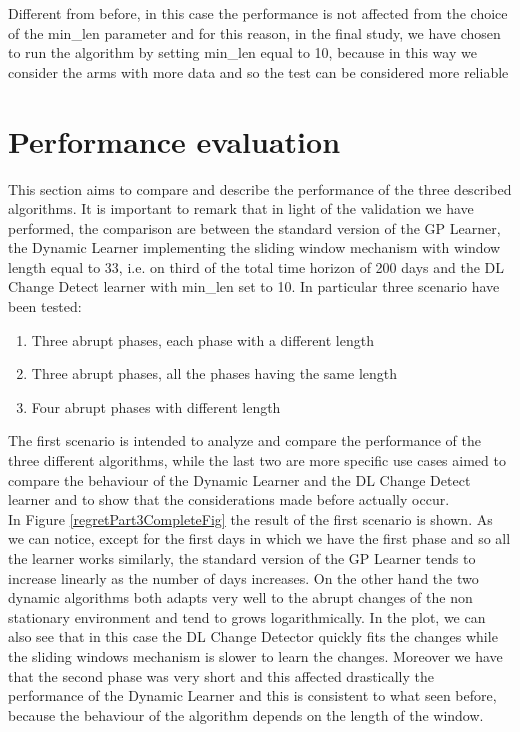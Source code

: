 Different from before, in this case the performance is not affected from the choice of the min\_len parameter and for this reason, in the final study, we have chosen to run the algorithm by setting min\_len equal to 10, because in this way we consider the arms with more data and so the test can be considered more reliable


\section{Performance evaluation}

This section aims to compare and describe the performance of the three described algorithms.
It is important to remark that in light of the validation we have performed, the comparison are between the standard version of the GP Learner, the Dynamic Learner implementing the sliding window mechanism with window length equal to 33, i.e. on third of the total time horizon of 200 days and the DL Change Detect learner with min\_len set to 10.
In particular three scenario have been tested:

\begin{enumerate}
\item Three abrupt phases, each phase with a different length
\item Three abrupt phases, all the phases having the same length
\item Four abrupt phases with different length
\end{enumerate}

The first scenario is intended to analyze and compare the performance of the three different algorithms, while the last two are more specific use cases aimed to compare the behaviour of the Dynamic Learner and the DL Change Detect learner and to show that the considerations made before actually occur.\\
In Figure \ref{regretPart3CompleteFig} the result of the first scenario is shown. As we can notice, except for the first days in which we have the first phase and so all the learner works similarly, the standard version of the GP Learner tends to increase linearly as the number of days increases. On the other hand the two dynamic algorithms both adapts very well to the abrupt changes of the non stationary environment and tend to grows logarithmically. In the plot, we can also see that in this case the DL Change Detector quickly fits the changes while the sliding windows mechanism is slower to learn the changes. Moreover we have that the second phase was very short and this affected drastically the performance of the Dynamic Learner and this is consistent to what seen before, because the behaviour of the algorithm depends on the length of the window. 

